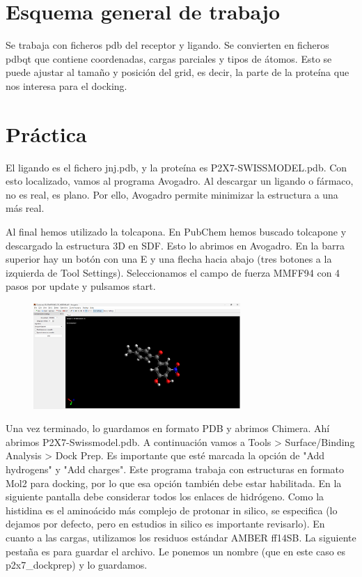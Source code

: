 \section{Esquema general de trabajo}
Se trabaja con ficheros pdb del receptor y ligando. Se convierten en ficheros pdbqt que contiene coordenadas, cargas parciales y tipos de átomos. Esto se puede ajustar al tamaño y posición del grid, es decir, la parte de la proteína que nos interesa para el docking.

\section{Práctica}
El ligando es el fichero jnj.pdb, y la proteína es P2X7-SWISSMODEL.pdb. Con esto localizado, vamos al programa Avogadro. Al descargar un ligando o fármaco, no es real, es plano. Por ello, Avogadro permite minimizar la estructura a una más real. 

Al final hemos utilizado la tolcapona. En PubChem hemos buscado tolcapone y descargado la estructura 3D en SDF. Esto lo abrimos en Avogadro. En la barra superior hay un botón con una E y una flecha hacia abajo (tres botones a la izquierda de Tool Settings). Seleccionamos el campo de fuerza MMFF94 con 4 pasos por update y pulsamos start. 

\begin{figure}[h]
\centering
\includegraphics[width = 0.7\textwidth]{figs/avogadro-tolcapona.png}
\end{figure}

Una vez terminado, lo guardamos en formato PDB y abrimos Chimera. Ahí abrimos P2X7-Swissmodel.pdb. A continuación vamos a Tools > Surface/Binding Analysis > Dock Prep. Es importante que esté marcada la opción de "Add hydrogens" y "Add charges". Este programa trabaja con estructuras en formato Mol2 para docking, por lo que esa opción también debe estar habilitada. En la siguiente pantalla debe considerar todos los enlaces de hidrógeno. Como la histidina es el aminoácido más complejo de protonar in silico, se especifica (lo dejamos por defecto, pero en estudios in silico es importante revisarlo). En cuanto a las cargas, utilizamos los residuos estándar AMBER ff14SB. La siguiente pestaña es para guardar el archivo. Le ponemos un nombre (que en este caso es p2x7\_dockprep) y lo guardamos.

